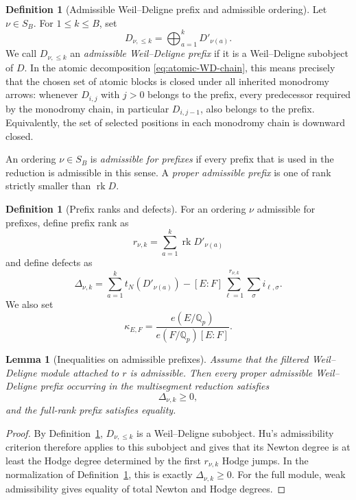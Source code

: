 \documentclass[12pt]{article}
\newtheorem{lemma}[theorem]{Lemma}
\theoremstyle{definition}
\newtheorem{definition}[theorem]{Definition}
\theoremstyle{remark}
\begin{document}
\begin{definition}[Admissible Weil--Deligne prefix and admissible ordering]
\label{def:admissible-wd-prefix}
Let \(\nu\in S_B\).  For \(1\leq k\leq B\), set
\[
 D_{\nu,\leq k}
 =
 \bigoplus_{a=1}^kD'_{\nu(a)}.
\]
We call \(D_{\nu,\leq k}\) an \emph{admissible Weil--Deligne prefix} if it
is a Weil--Deligne subobject of \(D\).  In the atomic decomposition
\eqref{eq:atomic-WD-chain}, this means precisely that the chosen set of
atomic blocks is closed under all inherited monodromy arrows: whenever
\(D_{i,j}\) with \(j>0\) belongs to the prefix, every predecessor required by
the monodromy chain, in particular \(D_{i,j-1}\), also belongs to the
prefix.  Equivalently, the set of selected positions in each monodromy chain
is downward closed.

An ordering \(\nu\in S_B\) is \emph{admissible for prefixes} if every prefix
that is used in the reduction is admissible in this sense.  A
\emph{proper admissible prefix} is one of rank strictly smaller than
\(\operatorname{rk}D\).
\end{definition}

\begin{definition}[Prefix ranks and defects]
\label{def:prefix-defects}
For an ordering \(\nu\) admissible for prefixes, define prefix rank as
\[
 r_{\nu,k}
 =
 \sum_{a=1}^k\operatorname{rk}D'_{\nu(a)}
\]
and define defects as
\begin{equation}\label{eq:defects-multisegment}
 \Delta_{\nu,k}
 =
 \sum_{a=1}^k t_N(D'_{\nu(a)})
 -
 [E:F]
 \sum_{\ell=1}^{r_{\nu,k}}\sum_\sigma i_{\ell,\sigma}.
\end{equation}
We also set
\begin{equation}\label{eq:kappa-multisegment}
 \kappa_{E,F}
 =
 \frac{e(E/\mathbb Q_p)}
 {e(F/\mathbb Q_p)[E:F]}.
\end{equation}
\end{definition}

\begin{lemma}[Inequalities on admissible prefixes]
\label{lem:admissible-prefix-inequalities}
Assume that the filtered Weil--Deligne module attached to \(r\) is
admissible.  Then every proper admissible Weil--Deligne prefix occurring in
the multisegment reduction satisfies
\[
 \Delta_{\nu,k}\geq0,
\]
and the full-rank prefix satisfies equality.
\end{lemma}

\begin{proof}
By Definition~\ref{def:admissible-wd-prefix},
\(D_{\nu,\leq k}\) is a Weil--Deligne subobject.  Hu's admissibility
criterion therefore applies to this subobject and gives that its Newton
degree is at least the Hodge degree determined by the first
\(r_{\nu,k}\) Hodge jumps.  In the normalization of
Definition~\ref{def:prefix-defects}, this is exactly
\(\Delta_{\nu,k}\geq0\).  For the full module, weak admissibility gives
equality of total Newton and Hodge degrees.
\end{proof}
\end{document}
